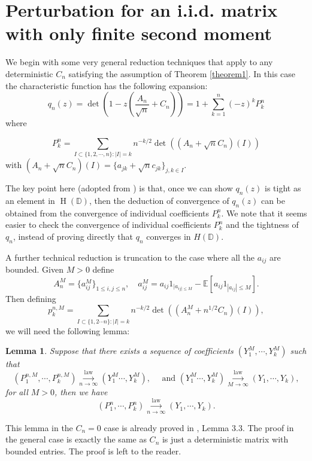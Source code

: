 \documentclass[12pt, reqno]{amsart}
\newtheorem{lemma}[theorem]{Lemma}
\theoremstyle{definition}
\theoremstyle{remark}
\numberwithin{equation}{section}
\begin{document}
\section{Perturbation for an i.i.d. matrix with only finite second moment}



We begin with some very general reduction techniques that apply to any deterministic $C_n$ satisfying the assumption of Theorem \ref{theorem1}. In this case the characteristic function has the following expansion:
$$
q_n(z)=\det(1-z(\frac{A_n}{\sqrt{n}}+C_n))=1+\sum_{k=1}^n (-z)^kP_k^{n}
$$
where 

$$
P_k^{n}=\sum_{I\subset \{1,2,\cdots,n\}:|I|=k}n^{-k/2}\det\left((A_n+\sqrt{n}C_n)(I)\right)
$$
with $(A_n+\sqrt{n}C_n)(I)=\{a_{jk}+\sqrt{n}c_{jk}\}_{j,k\in I}$.


The key point here (adopted from \cite{bordenave2021convergence}) is that, once we can show $q_n(z)$ is tight as an element in $\operatorname{H}(\mathbb{D})$, then the deduction of convergence of $q_n(z)$ can be obtained from the convergence of individual coefficients $P_k^{n}$. We note that it seems easier to check the convergence of individual coefficients $P_k^n$ and the tightness of $q_n$, instead of proving directly that $q_n$ converges in $H(\mathbb{D}).$ 

A further technical reduction is truncation to the case where all the $a_{ij}$ are bounded. Given $M>0$ define $$A_n^M=\{a_{ij}^M\}_{1\leq i,j\leq n},\quad a_{ij}^M=a_{ij}1_{|a_{ij|\leq M}}-\mathbb{E}[a_{ij}1_{|a_{ij}|\leq M}].$$
Then defining $$p_k^{n,M}=\sum_{I\subset\{1,2\cdots n\}:|I|=k}n^{-k/2}\det\left((A_n^M+n^{1/2}C_n)(I)\right),$$ we will need the following lemma:

\begin{lemma}\label{greatlemma2.34}
Suppose that there exists a sequence of coefficients $(Y_1^M,\cdots,Y_k^M)$ such that 
$$ (P_1^{n,M},\cdots,P_k^{n,M})
\overset{\text{law}}{\underset{n\to\infty}{\longrightarrow}} (Y_1^M\cdots,Y_k^M),\quad \text{ and } (Y_1^M\cdots,Y_k^M)\overset{\text{law}}{\underset{M\to\infty}{\longrightarrow}} (Y_1,\cdots,Y_k), 
$$for all $M>0$, then we have 
$$
(P_1^n,\cdots,P_k^n)\overset{\text{law}}{\underset{n\to\infty}{\longrightarrow}} (Y_1,\cdots,Y_k).
$$
\end{lemma}
This lemma in the $C_n=0$ case is already proved in \cite{bordenave2021convergence}, Lemma 3.3. The proof in the general case is exactly the same as $C_n$ is just a deterministic matrix with bounded entries. The proof is left to the reader.
\end{document}
